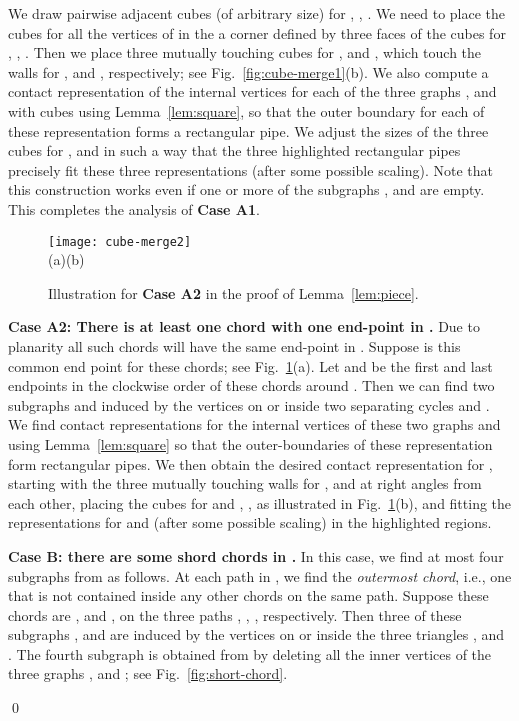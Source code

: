 \documentclass{llncs}
\renewenvironment{proof}{\medskip\noindent{\bf Proof:}}{\mbox{}\hfill\qed\par}
\begin{document}
\begin{proof}
We draw pairwise adjacent cubes (of arbitrary size) for , ,
. We need to place the cubes for all the vertices of  in the a
corner defined by three faces of the cubes for , , . 
Then we place three mutually touching cubes for
 ,  and , which touch the walls for ,  and , respectively; see
 Fig.~\ref{fig:cube-merge1}(b). We also compute a contact representation of the internal
 vertices for each of the
 three graphs ,  and  with cubes using Lemma~\ref{lem:square}, so that
 the outer boundary for each of these representation forms a rectangular pipe. We adjust
 the sizes of the three cubes for ,  and  in such a way that the three highlighted
 rectangular pipes precisely fit these three representations (after some possible scaling).
 Note that this construction works even if one or more of the subgraphs ,  and
  are empty. This completes the analysis of \textbf{Case A1}.




\begin{figure}[tb]
\centering
	\texttt{[image: cube-merge2]}\\
	(a)\hspace{0.38\textwidth}(b)\hspace{0.05\textwidth}
	\caption{Illustration for \textbf{Case A2} in the proof of Lemma~\ref{lem:piece}.}
	\label{fig:cube-merge2}
\end{figure}




\textbf{Case A2: There is at least one chord with one end-point in .} Due to planarity
 all such chords will have the same end-point in . Suppose  is this common end
 point for these chords; see Fig.~\ref{fig:cube-merge2}(a).
 Let  and  be the first and last endpoints in the clockwise order of these chords
 around . Then we can find two subgraphs  and 
 induced by the vertices on or inside two separating cycles  and . We
 find contact representations for the internal vertices of these two graphs  and 
 using Lemma~\ref{lem:square} so that the outer-boundaries of these representation form
 rectangular pipes. We then obtain the desired contact representation for , starting with the
 three mutually touching walls for ,  and  at right angles
 from each other, placing
 the cubes for  and , ,  as illustrated in
 Fig.~\ref{fig:cube-merge2}(b), and fitting the representations for  and  (after some
 possible scaling) in the highlighted regions.






\smallskip\noindent
\textbf{Case B: there are some shord chords in .}
 In this case, we find at most four subgraphs from  as follows. At each path in
 , we find the \textit{outermost chord},
 i.e., one that is not contained inside any other chords on the same path.
 Suppose these chords are ,
  and , on the three paths , , , respectively.
 Then three of these subgraphs ,  and  are  induced by the vertices
 on or inside the three
triangles ,  and .
 The fourth subgraph  is obtained from  by deleting all the inner
 vertices of the three graphs ,  and ; see Fig.~\ref{fig:short-chord}.


\end{proof}
\end{document}
